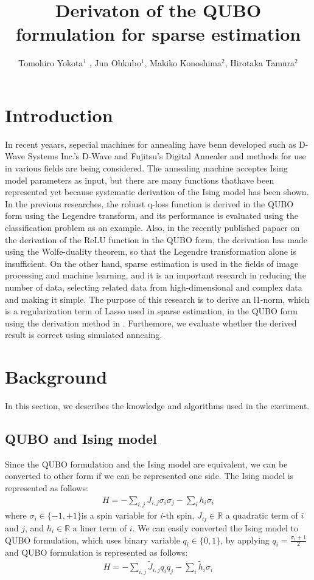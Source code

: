 \documentclass[fp,twocolumn]{jpsj3}
\title{Derivaton of the QUBO formulation for sparse estimation}
\author{Tomohiro Yokota$^1$%
  , Jun Ohkubo$^1$, Makiko Konoshima$^2$, Hirotaka Tamura$^2$}
\begin{document}
\maketitle

\section{Introduction}
In recent yeaars, sepecial machines for annealing have benn developed such as D-Wave Systems Inc.'s D-Wave\cite{d-wave01, d-wave02} and Fujitsu's Digital Annealer\cite{DA} and methods for use in various fields are being considered. The annealing machine acceptes Ising model parameters as input, but there are many functions thathave been represented yet because systematic derivation of the Ising model has been shown.
In the previous researches, the robust q-loss function is derived in the QUBO form using the Legendre transform\cite{q-loss}, and its performance is evaluated using the classification problem as an example. Also, in the recently published papaer on the derivation of the ReLU function in the QUBO form\cite{relu}, the derivation has made using the Wolfe-duality theorem\cite{wolfe}, so that the Legendre transformation alone is insufficient.
On the other hand, sparse estimation is used in the fields of image processing and machine learning, and it is an important research in reducing the number of data, selecting related data from high-dimensional and complex data and making it simple.
The purpose of this research is to derive an l1-norm, which is a regularization term of Lasso\cite{lasso} used in sparse estimation, in the QUBO form using the derivation method in \cite{relu}. Furthemore, we evaluate whether the derived result is correct using simulated anneaing.

\section{Background}
In this section, we describes the knowledge and algorithms used in the exeriment.

\subsection{QUBO and Ising model} %
Since the QUBO formulation and the Ising model are equivalent, we can be converted to other form if we can be represented one side. The Ising model is represented as follows:
\begin{eqnarray}
  H=-\sum_{i,j}{J_{i,j}\sigma_{i}\sigma_{j}}-\sum_{i}{h_{i}\sigma_{i}}
\end{eqnarray}
where $\sigma_{i}\in \{-1,+1\}$is a spin variable for $i$-th spin, $J_{ij}\in \mathbb{R}$ a quadratic term of $i$ and $j$, and $h_{i}\in \mathbb{R}$ a liner term of $i$. We can easily converted the Ising model to QUBO formulation, which uses binary variable $q_{i}\in \{0,1\}$, by applying $q_{i}=\frac{\sigma_{i}+1}{2}$ and QUBO formulation is represented as follows:
\begin{eqnarray}
  H=-\sum_{i,j}{\tilde{J}_{i,j}q_{i}q_{j}}-\sum_{i}{\tilde{h}_{i}\sigma_{i}}
\end{eqnarray}
\end{document}
